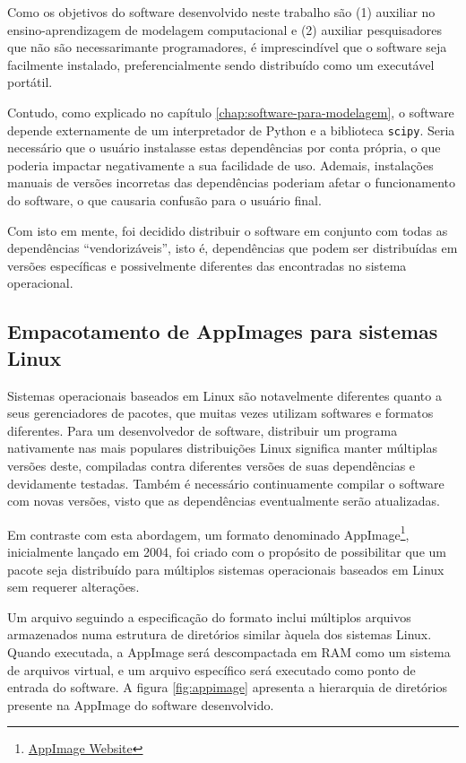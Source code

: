 \documentclass[
	12pt,				%
	openright,			%
	oneside,			%
	a4paper,			%
	main=brazil,
	english,			%
	]{ufsj-abntex2}
\begin{document}
Como os objetivos do software desenvolvido neste trabalho são (1) auxiliar no ensino-aprendizagem de modelagem computacional e (2) auxiliar pesquisadores que não são necessarimante programadores, é imprescindível que o software seja facilmente instalado, preferencialmente sendo distribuído como um executável portátil.

Contudo, como explicado no capítulo \ref{chap:software-para-modelagem}, o software depende externamente de um interpretador de Python e a biblioteca \texttt{scipy}. Seria necessário que o usuário instalasse estas dependências por conta própria, o que poderia impactar negativamente a sua facilidade de uso. Ademais, instalações manuais de versões incorretas das dependências poderiam afetar o funcionamento do software, o que causaria confusão para o usuário final.

Com isto em mente, foi decidido distribuir o software em conjunto com todas as dependências ``vendorizáveis'', isto é, dependências que podem ser distribuídas em versões específicas e possivelmente diferentes das encontradas no sistema operacional.

\subsection{Empacotamento de AppImages para sistemas Linux}

Sistemas operacionais baseados em Linux são notavelmente diferentes quanto a seus gerenciadores de pacotes, que muitas vezes utilizam softwares e formatos diferentes. Para um desenvolvedor de software, distribuir um programa nativamente nas mais populares distribuições Linux significa manter múltiplas versões deste, compiladas contra diferentes versões de suas dependências e devidamente testadas. Também é necessário continuamente compilar o software com novas versões, visto que as dependências eventualmente serão atualizadas.

Em contraste com esta abordagem, um formato denominado AppImage\footnote{\href{https://appimage.org/}{AppImage Website}}, inicialmente lançado em 2004, foi criado com o propósito de possibilitar que um pacote seja distribuído para múltiplos sistemas operacionais baseados em Linux sem requerer alterações.

Um arquivo seguindo a especificação do formato inclui múltiplos arquivos armazenados numa estrutura de diretórios similar àquela dos sistemas Linux. Quando executada, a AppImage será descompactada em RAM como um sistema de arquivos virtual, e um arquivo específico será executado como ponto de entrada do software. A figura \ref{fig:appimage} apresenta a hierarquia de diretórios presente na AppImage do software desenvolvido.
\end{document}
